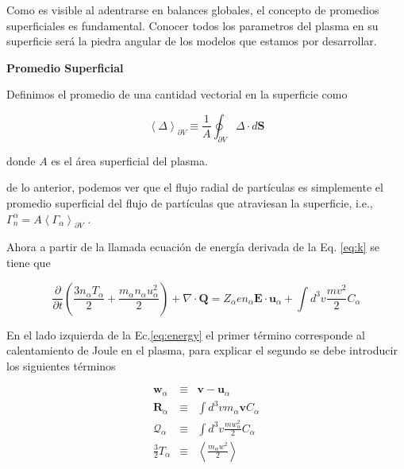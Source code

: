 \documentclass[11pt]{article}
\theoremstyle{definition}
\begin{document}
  Como es visible al adentrarse en balances globales, el concepto de promedios superficiales es fundamental. Conocer todos los parametros del plasma en su superficie ser\'a la piedra angular de los modelos que estamos por desarrollar.

  \begin{shaded}
    \textbf{Promedio Superficial}

    Definimos el promedio de una cantidad vectorial en la superficie como 

    \begin{equation}
      \left<\pmb{\varDelta}\right>_{\partial V} \equiv \frac{1}{A}\oint_{\partial V}\pmb{\varDelta}\cdot d\textbf{S}
    \end{equation}

    donde $A$ es el \'area superficial del plasma.
  \end{shaded}

  de lo anterior, podemos ver que el flujo radial de part\'iculas es simplemente el promedio superficial del flujo de part\'iculas que atraviesan la superficie, i.e., $\Gamma_n^\alpha = A\left<\Gamma_\alpha\right>_{\partial V}$ \cite{dinklage2005}.
  
  Ahora a partir de la llamada ecuaci\'on de energ\'ia \cite{helander2005} derivada de la Eq. \eqref{eq:k} se tiene que

  \begin{equation}\label{eq:energy}
    \frac{\partial}{\partial t}\left(\frac{3n_\alpha T_\alpha}{2} + \frac{m_\alpha n_\alpha u_\alpha^2}{2}\right) + \nabla\cdot\textbf{Q} = Z_\alpha e n_\alpha \textbf{E}\cdot\textbf{u}_\alpha + \int d^3v\frac{mv^2}{2}C_\alpha
  \end{equation} 

  En el lado izquierda de la Ec.\eqref{eq:energy} el primer t\'ermino corresponde al calentamiento de Joule en el plasma, para explicar el segundo se debe introducir los siguientes t\'erminos

  \begin{eqnarray}
    \textbf{w}_\alpha &\equiv& \textbf{v} - \textbf{u}_\alpha \nonumber\\
    \textbf{R}_\alpha &\equiv& \int d^3v m_\alpha\textbf{v}C_\alpha \nonumber\\
    \mathcal{Q}_\alpha &\equiv& \int d^3v \frac{mw_\alpha^2}{2}C_\alpha \nonumber\\
    \frac{3}{2}T_\alpha &\equiv& \left<\frac{m_\alpha w^2}{2}\right> \label{eq:temp}
  \end{eqnarray}
\end{document}

